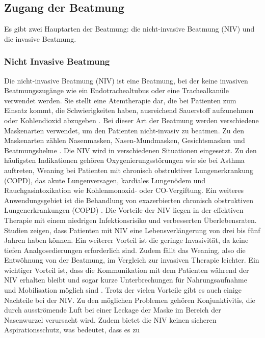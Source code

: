 \documentclass[a4paper,12pt]{article}
\begin{document}
\subsection{Zugang der Beatmung}

Es gibt zwei Hauptarten der Beatmung: die nicht-invasive Beatmung (NIV) und die invasive Beatmung.

\subsubsection{Nicht Invasive Beatmung}

Die nicht-invasive Beatmung (NIV) ist eine Beatmung, bei der keine invasiven Beatmungszugänge
wie ein Endotrachealtubus oder eine Trachealkanüle verwendet werden. Sie stellt eine
Atemtherapie dar, die bei Patienten zum Einsatz kommt, die Schwierigkeiten haben, ausreichend
Sauerstoff aufzunehmen oder Kohlendioxid abzugeben \cite{NichtinvasiveBeatmungUltimative}.
Bei dieser Art der Beatmung werden
verschiedene Maskenarten verwendet, um den Patienten nicht-invasiv zu beatmen. Zu den Maskenarten
zählen Nasenmasken, Nasen-Mundmasken, Gesichtsmasken und Beatmungshelme \cite{schleicherNIVBeatmungWannSetzt2019}.
Die NIV wird in verschiedenen Situationen eingesetzt. Zu den häufigsten Indikationen gehören
Oxygenierungsstörungen wie sie bei Asthma auftreten, Weaning bei Patienten mit chronisch obstruktiver
Lungenerkrankung (COPD), das akute Lungenversagen, kardiales Lungenödem und Rauchgasintoxikation
wie Kohlenmonoxid- oder CO-Vergiftung. Ein weiteres Anwendungsgebiet ist die Behandlung von
exazerbierten chronisch obstruktiven Lungenerkrankungen (COPD) \cite{NichtinvasiveBeatmungUltimative}.
Die Vorteile der NIV liegen in der effektiven Therapie mit einem niedrigen Infektionsrisiko und
verbesserten Überlebensraten. Studien zeigen, dass Patienten mit NIV eine Lebensverlängerung von
drei bis fünf Jahren haben können.
Ein weiterer Vorteil ist die geringe Invasivität, da keine
tiefen Analgosedierungen erforderlich sind. Zudem fällt das Weaning, also die Entwöhnung von der
Beatmung, im Vergleich zur invasiven Therapie leichter. Ein wichtiger Vorteil ist, dass die Kommunikation
mit dem Patienten während der NIV erhalten bleibt und sogar kurze Unterbrechungen für Nahrungsaufnahme
und Mobilisation möglich sind \cite{InvasiveUndNichtinvasive}.
Trotz der vielen Vorteile gibt es auch einige Nachteile bei der NIV. Zu den möglichen Problemen gehören
Konjunktivitis, die durch ausströmende Luft bei einer Leckage der Maske im Bereich der Nasenwurzel
verursacht wird. Zudem bietet die NIV keinen sicheren Aspirationsschutz, was bedeutet, dass es zu
\end{document}

